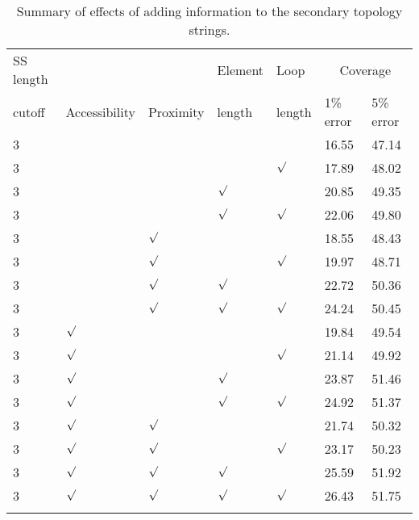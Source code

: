 \documentclass{article}
\newcommand{\tick}{\mbox{$\surd$}}
\begin{document}
\begin{table}
\caption{\label{tab:summary}Summary of effects of adding information
to the secondary topology strings.}
\begin{tabularx}{\linewidth}{lllllXX} \hline
SS length &               &           & Element & Loop   & \multicolumn{2}{c}{Coverage} \\ \cline{6-7}
cutoff    & Accessibility & Proximity & length  & length & 1\% error & 5\% error \\ \hline
3         &               &           &         &        & 16.55     & 47.14     \\
3         &               &           &         & \tick  & 17.89     & 48.02     \\
3         &               &           & \tick   &        & 20.85     & 49.35     \\
3         &               &           & \tick   & \tick  & 22.06     & 49.80     \\
3         &               & \tick     &         &        & 18.55     & 48.43     \\
3         &               & \tick     &         & \tick  & 19.97     & 48.71     \\
3         &               & \tick     & \tick   &        & 22.72     & 50.36     \\
3         &               & \tick     & \tick   & \tick  & 24.24     & 50.45     \\
3         & \tick         &           &         &        & 19.84     & 49.54     \\
3         & \tick         &           &         & \tick  & 21.14     & 49.92     \\
3         & \tick         &           & \tick   &        & 23.87     & 51.46     \\
3         & \tick         &           & \tick   & \tick  & 24.92     & 51.37     \\
3         & \tick         & \tick     &         &        & 21.74     & 50.32     \\
3         & \tick         & \tick     &         & \tick  & 23.17     & 50.23     \\
3         & \tick         & \tick     & \tick   &        & 25.59     & 51.92     \\
3         & \tick         & \tick     & \tick   & \tick  & 26.43     & 51.75     \\
          &               &           &         &        &           &           \\

\end{tabularx}
\end{table}
\end{document}
